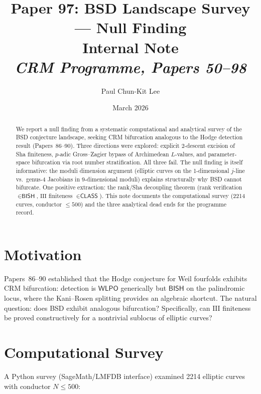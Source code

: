\documentclass[11pt,a4paper]{article}
\title{\textbf{Paper 97: BSD Landscape Survey --- Null Finding}\\[6pt]
\large Internal Note\\[4pt]
\normalsize\textit{CRM Programme, Papers 50--98}}
\author{Paul Chun-Kit Lee}
\date{March 2026}
\theoremstyle{plain}
\theoremstyle{definition}
\newcommand{\BISH}{\textsf{BISH}}
\newcommand{\WLPO}{\textsf{WLPO}}
\newcommand{\CLASS}{\textsf{CLASS}}
\newcommand{\Sha}{\mathrm{III}}
\newcommand{\rank}{\mathrm{rank}}
\begin{document}
\maketitle

\begin{abstract}
We report a null finding from a systematic computational and analytical survey of the BSD conjecture landscape, seeking CRM bifurcation analogous to the Hodge detection result (Papers~86--90). Three directions were explored: explicit 2-descent excision of Sha finiteness, $p$-adic Gross--Zagier bypass of Archimedean $L$-values, and parameter-space bifurcation via root number stratification. All three fail. The null finding is itself informative: the moduli dimension argument (elliptic curves on the 1-dimensional $j$-line vs.\ genus-4 Jacobians in 9-dimensional moduli) explains structurally why BSD cannot bifurcate. One positive extraction: the rank/Sha decoupling theorem ($\rank$ verification $\in \BISH$, $\Sha$ finiteness $\in \CLASS$). This note documents the computational survey (2214 curves, conductor $\leq 500$) and the three analytical dead ends for the programme record.
\end{abstract}

\section{Motivation}

Papers~86--90 established that the Hodge conjecture for Weil fourfolds exhibits CRM bifurcation: detection is $\WLPO$ generically but $\BISH$ on the palindromic locus, where the Kani--Rosen splitting provides an algebraic shortcut. The natural question: does BSD exhibit analogous bifurcation? Specifically, can $\Sha$ finiteness be proved constructively for a nontrivial sublocus of elliptic curves?

\section{Computational Survey}

A Python survey (SageMath/LMFDB interface) examined 2214 elliptic curves with conductor $N \leq 500$:
\end{document}
